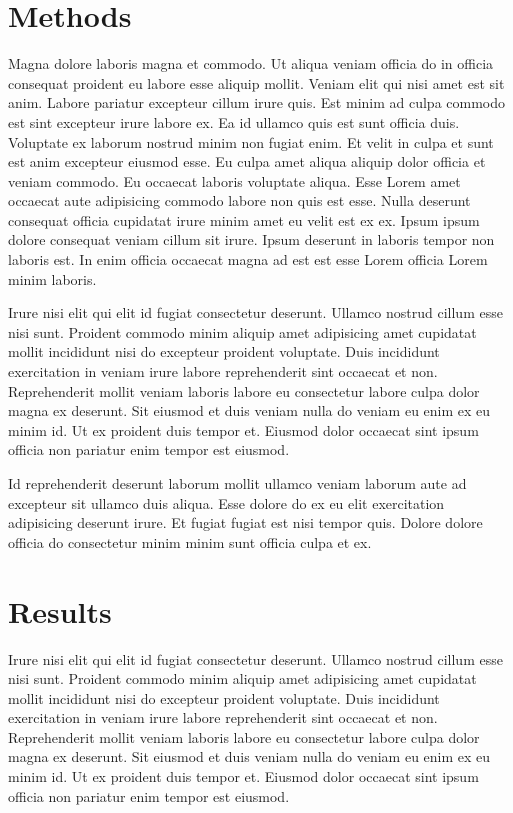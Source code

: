\section{Methods}
Magna dolore laboris magna et commodo. Ut aliqua veniam officia do in officia consequat proident eu labore esse aliquip mollit. Veniam elit qui nisi amet est sit anim. Labore pariatur excepteur cillum irure quis. Est minim ad culpa commodo est sint excepteur irure labore ex.
Ea id ullamco quis est sunt officia duis. Voluptate ex laborum nostrud minim non fugiat enim. Et velit in culpa et sunt est anim excepteur eiusmod esse. Eu culpa amet aliqua aliquip dolor officia et veniam commodo.
Eu occaecat laboris voluptate aliqua. Esse Lorem amet occaecat aute adipisicing commodo labore non quis est esse. Nulla deserunt consequat officia cupidatat irure minim amet eu velit est ex ex. Ipsum ipsum dolore consequat veniam cillum sit irure. Ipsum deserunt in laboris tempor non laboris est. In enim officia occaecat magna ad est est esse Lorem officia Lorem minim laboris.

Irure nisi elit qui elit id fugiat consectetur deserunt. Ullamco nostrud cillum esse nisi sunt. Proident commodo minim aliquip amet adipisicing amet cupidatat mollit incididunt nisi do excepteur proident voluptate. Duis incididunt exercitation in veniam irure labore reprehenderit sint occaecat et non.
Reprehenderit mollit veniam laboris labore eu consectetur labore culpa dolor magna ex deserunt. Sit eiusmod et duis veniam nulla do veniam eu enim ex eu minim id. Ut ex proident duis tempor et. Eiusmod dolor occaecat sint ipsum officia non pariatur enim tempor est eiusmod.

Id reprehenderit deserunt laborum mollit ullamco veniam laborum aute ad excepteur sit ullamco duis aliqua. Esse dolore do ex eu elit exercitation adipisicing deserunt irure. Et fugiat fugiat est nisi tempor quis. Dolore dolore officia do consectetur minim minim sunt officia culpa et ex.

\section{Results}
  
Irure nisi elit qui elit id fugiat consectetur deserunt. Ullamco nostrud cillum esse nisi sunt. Proident commodo minim aliquip amet adipisicing amet cupidatat mollit incididunt nisi do excepteur proident voluptate. Duis incididunt exercitation in veniam irure labore reprehenderit sint occaecat et non.
Reprehenderit mollit veniam laboris labore eu consectetur labore culpa dolor magna ex deserunt. Sit eiusmod et duis veniam nulla do veniam eu enim ex eu minim id. Ut ex proident duis tempor et. Eiusmod dolor occaecat sint ipsum officia non pariatur enim tempor est eiusmod.


